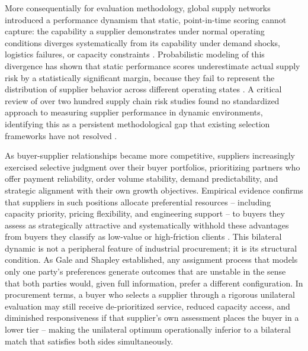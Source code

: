 \documentclass[11pt]{article}
\begin{document}
More consequentially for evaluation methodology, global supply networks introduced a performance dynamism that static, point-in-time scoring cannot capture: the capability a supplier demonstrates under normal operating conditions diverges systematically from its capability under demand shocks, logistics failures, or capacity constraints \cite{ref10}. Probabilistic modeling of this divergence has shown that static performance scores underestimate actual supply risk by a statistically significant margin, because they fail to represent the distribution of supplier behavior across different operating states \cite{ref15}. A critical review of over two hundred supply chain risk studies found no standardized approach to measuring supplier performance in dynamic environments, identifying this as a persistent methodological gap that existing selection frameworks have not resolved \cite{ref17}.

As buyer-supplier relationships became more competitive, suppliers increasingly exercised selective judgment over their buyer portfolios, prioritizing partners who offer payment reliability, order volume stability, demand predictability, and strategic alignment with their own growth objectives. Empirical evidence confirms that suppliers in such positions allocate preferential resources -- including capacity priority, pricing flexibility, and engineering support -- to buyers they assess as strategically attractive and systematically withhold these advantages from buyers they classify as low-value or high-friction clients \cite{ref14}. This bilateral dynamic is not a peripheral feature of industrial procurement; it is its structural condition. As Gale and Shapley \cite{ref8} established, any assignment process that models only one party's preferences generate outcomes that are unstable in the sense that both parties would, given full information, prefer a different configuration. In procurement terms, a buyer who selects a supplier through a rigorous unilateral evaluation may still receive de-prioritized service, reduced capacity access, and diminished responsiveness if that supplier's own assessment places the buyer in a lower tier -- making the unilateral optimum operationally inferior to a bilateral match that satisfies both sides simultaneously.
\end{document}
